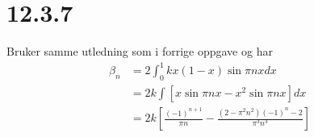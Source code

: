\documentclass{report}
\newcommand{\nbrack}[1]{\left( #1 \right)}
\newcommand{\bbrack}[1]{\left[ #1 \right]}
\begin{document}
\section*{12.3.7}
Bruker samme utledning som i forrige oppgave og har
\begin{equation}
  \label{eq:19}
  \begin{split}
    \beta_{n} &= 2 \int_{0}^{1} kx(1-x) \sin \pi nx dx \\
              &= 2k \int \bbrack{ x\sin \pi nx - x^{2}\sin \pi nx } dx \\
    &= 2k \bbrack{ \frac{(-1)^{n+1}}{\pi n} - \frac{ \nbrack{ 2 - \pi ^{2} n^{2} } (-1)^{n} - 2 }{\pi^{3} n^{3}} }
  \end{split}
\end{equation}
\end{document}
